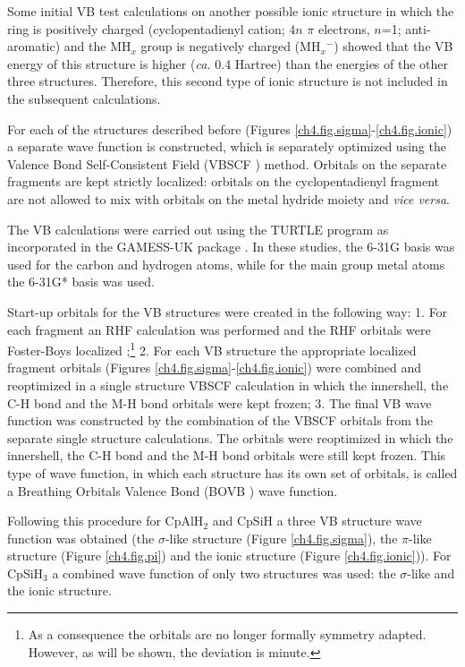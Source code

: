 Some initial VB test calculations on another possible ionic structure in which the ring is positively charged (cyclopentadienyl cation; $4n$ $\pi$ electrons, $n$=1; anti-aromatic) and the MH$_x$ group is negatively charged (MH${_x}{^-}$) showed that the VB energy of this structure is higher (\textit{ca.} 0.4 Hartree) than the energies of the other three structures. Therefore, this second type of ionic structure is not included in the subsequent calculations.

For each of the structures described before (Figures \ref{ch4.fig.sigma}-\ref{ch4.fig.ionic}) a separate wave function is constructed, which is separately optimized using the Valence Bond Self-Consistent Field (VBSCF \cite{vbscf1,vbscf2}) method. Orbitals on the separate fragments are kept strictly localized: orbitals on the cyclopentadienyl fragment are not allowed to mix with orbitals on the metal hydride moiety and \textit{vice versa}.

The VB calculations were carried out using the \mbox{TURTLE} program \cite{turtle} as incorporated in the GAMESS-UK package \cite{gamess}. In these studies, the \mbox{6-31G} basis was used for the carbon and hydrogen atoms, while for the main group metal atoms the 6-31G* basis was used. 

Start-up orbitals for the VB structures were created in the following way: 1. For each fragment an RHF calculation was performed and the RHF orbitals were Foster-Boys localized \cite{foster};\footnote{\label{ch4.foot.consequence}As a consequence the orbitals are no longer formally symmetry adapted. However, as will be shown, the deviation is minute.} 2. For each VB structure the appropriate localized fragment orbitals (Figures \ref{ch4.fig.sigma}-\ref{ch4.fig.ionic}) were combined and reoptimized in a single structure VBSCF calculation in which the innershell, the C-H bond and the M-H bond orbitals were kept frozen; 3. The final VB wave function was constructed by the combination of the VBSCF orbitals from the separate single structure calculations. The orbitals were reoptimized in which the innershell, the C-H bond and the M-H bond orbitals were still kept frozen. This type of wave function, in which each structure has its own set of orbitals, is called a Breathing Orbitals Valence Bond (BOVB \cite{bovb1,bovb2}) wave function. 

Following this procedure  for CpAlH$_2$ and CpSiH a three VB structure wave function was obtained (the $\sigma$-like structure (Figure \ref{ch4.fig.sigma}), the $\pi$-like structure (Figure \ref{ch4.fig.pi}) and the ionic structure (Figure \ref{ch4.fig.ionic})). For CpSiH$_3$ a combined wave function of only two structures was used: the $\sigma$-like and the ionic structure.

